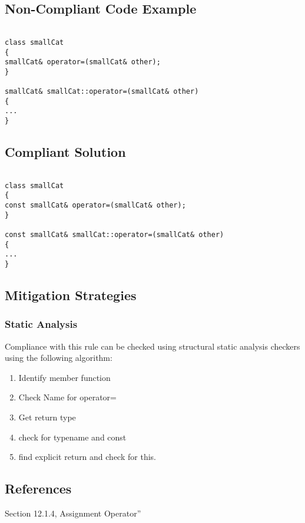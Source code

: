 \subsection{Non-Compliant Code Example}


\begin{verbatim}

class smallCat
{
smallCat& operator=(smallCat& other);
}

smallCat& smallCat::operator=(smallCat& other)
{
...
}

\end{verbatim}

\subsection{Compliant Solution}


\begin{verbatim}

class smallCat
{
const smallCat& operator=(smallCat& other);
}

const smallCat& smallCat::operator=(smallCat& other)
{
...
}
\end{verbatim}

\subsection{Mitigation Strategies}
\subsubsection{Static Analysis} 

Compliance with this rule can be checked using structural static analysis checkers using the following algorithm:

\begin{enumerate}
\item Identify member function
\item Check Name for operator=
\item Get return type
\item check for typename and const
\item find explicit return and check for this.
\end{enumerate}

\subsection{References}

 Section 12.1.4, Assignment Operator''
